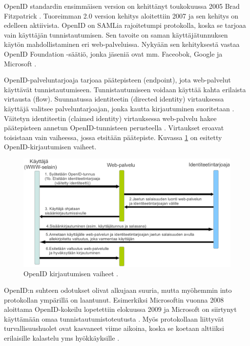 OpenID standardin ensimmäisen version on kehittänyt toukokuussa 2005 Brad Fitzpatrick \cite{openid}. Tuoreimman 2.0 version kehitys aloitettiin 2007 ja sen kehitys on edelleen aktiivista. OpenID on SAMLia rajoitetumpi protokolla, koska se tarjoaa vain käyttäjän tunnistautumisen. Sen tavoite on saman käyttäjätunnuksen käytön mahdollistaminen eri web-palveluissa. Nykyään sen kehityksestä vastaa \mbox{OpenID} Foundation -säätiö, jonka jäseniä ovat mm. Faceobok, Google ja Microsoft \cite{openid_foundation}.

OpenID-palveluntarjoaja tarjoaa päätepisteen (endpoint), jota web-palvelut käyttävät tunnistautumiseen. Tunnistautumiseen voidaan käyttää kahta erilaista virtausta (flow). Suunnatussa identiteetin (directed identity) virtauksessa käyttäjä valitsee palveluntarjoajan, jonka kautta kirjautuminen suoritetaan \cite{openid}. Väitetyn identiteetin (claimed identity) virtauksessa web-palvelu hakee päätepisteen annetun OpenID\--tun\-nis\-teen perusteella \cite{openid}. Virtaukset eroavat toisistaan vain vaiheessa, jossa etsitään päätepiste. Kuvassa \ref{openid_flow} on esitetty OpenID-kirjautumisen vaiheet.

\begin{figure}[ht]
\centering
\includegraphics[width=\textwidth]{teknologiat/protokollat/openid.eps}
\caption{OpenID kirjautumisen vaiheet \cite{openid}.}%
\label{openid_flow}
\end{figure}

OpenID:n suhteen odotukset olivat alkujaan suuria, mutta myöhemmin into protokollan ympärillä on laantunut. Esimerkiksi Microsoftin vuonna 2008 aloittama OpenID-kokeilu lopetettiin elokuussa 2009 ja Microsoft on siirtynyt käyttämään omaa tunnistautumistoteutusta \cite{openid_microsoft}. Myös protokollaan liittyvät turvallisuushuolet ovat kasvaneet viime aikoina, koska se koetaan alttiiksi erilaisille kalastelu yms hyökkäyksille \cite{billion_keys}.

